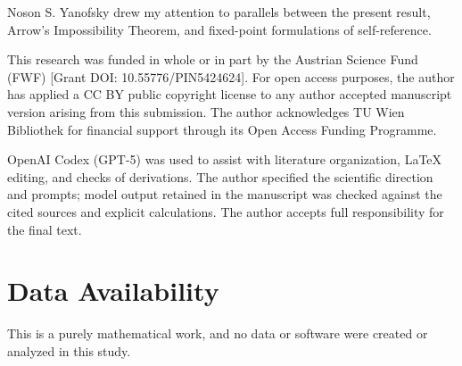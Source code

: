 \documentclass[aps,pra,reprint,superscriptaddress,amsmath,amssymb,floatfix]{revtex4-2}
\theoremstyle{plain}
\theoremstyle{definition}
\theoremstyle{remark}
\begin{document}
\begin{acknowledgments}
Noson S. Yanofsky drew my attention to parallels between the present result,
Arrow's Impossibility Theorem, and fixed-point formulations of
self-reference.

This research was funded in whole or in part by the Austrian Science Fund
(FWF) [Grant DOI: 10.55776/PIN5424624]. For open access purposes, the author
has applied a CC BY public copyright license to any author accepted manuscript
version arising from this submission. The author acknowledges TU Wien
Bibliothek for financial support through its Open Access Funding Programme.

OpenAI Codex (GPT-5) was used to assist with literature organization, LaTeX
editing, and checks of derivations. The author specified the scientific
direction and prompts; model output retained in the manuscript was checked
against the cited sources and explicit calculations. The author accepts full
responsibility for the final text.
\end{acknowledgments}

\section*{Data Availability}
This is a purely mathematical work, and no data or software were created or
analyzed in this study.


\end{document}

